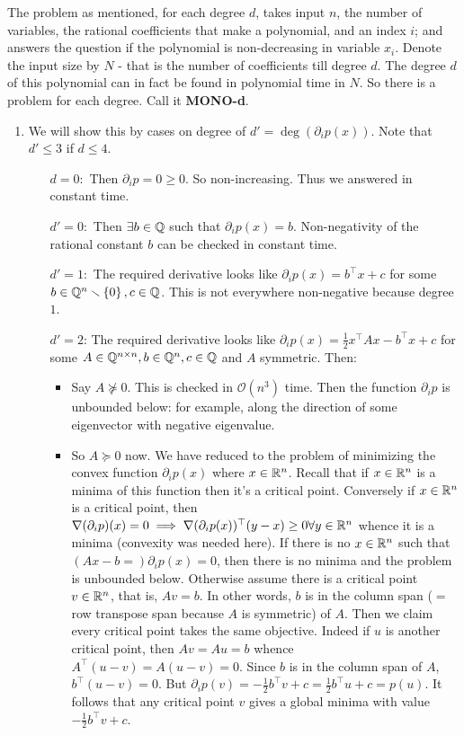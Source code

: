 The problem as mentioned, for each degree $d$, takes input $n$, the number of variables, the rational coefficients that make a polynomial, and an index $i$; and answers the question if the polynomial is non-decreasing in variable $x_{i}$. Denote the input size by $N$ - that is the number of coefficients till degree $d$. The degree $d$ of this polynomial can in fact be found in polynomial time in $N$. So there is a problem for each degree. Call it \textbf{MONO-d}.

\begin{enumerate}[label=(\roman*)]
\item We will show this by cases on degree of $d'=\deg(\partial_{i}p(x))$. Note that $d'\le 3$ if $d\le 4$.
\begin{itemize}
\item[$d=0:$] Then $\partial_{i}p = 0\ge 0$. So non-increasing. Thus we answered in constant time.
\item[$d'=0:$] Then $\exists b\in \mathbb{Q}$ such that $\partial_{i}p(x) = b$. Non-negativity of the rational constant $b$ can be checked in constant time.
\item[$d'=1:$] The required derivative looks like $\partial_{i}p(x) = b^{\top}x + c$ for some $b\in\mathbb{Q}^{n}\smallsetminus \left\{0\right\}, c\in\mathbb{Q}$. This is not everywhere non-negative because degree $1$.
\item[$d'=2$:] The required derivative looks like $\partial_{i}p(x) = \frac12x^{\top}Ax - b^{\top}x + c$ for some $A\in\mathbb{Q}^{n\times n},b\in\mathbb{Q}^{n}, c\in\mathbb{Q}$ and $A$ symmetric. Then:
\begin{itemize}
\item Say $A \not\succeq 0$. This is checked in $\mathcal{O}(n^{3})$ time. Then the function $\partial_{i}p$ is unbounded below: for example, along the direction of some eigenvector with negative eigenvalue.
\item So $A\succeq 0$ now. We have reduced to the problem of minimizing the convex function $\partial_{i}p(x)$ where $x\in\mathbb{R}^{n}$. Recall that if $x\in\mathbb{R}^{n}$ is a minima of this function then it's a critical point. Conversely if $x\in \mathbb{R}^{n}$ is a critical point, then $\nabla(\partial_{i}p)(x) = 0\implies \nabla(\partial_{i}p(x))^{\top}(y-x)\ge0\forall y\in\mathbb{R}^{n}$ whence it is a minima (convexity was needed here). If there is no $x\in\mathbb{R}^{n}$ such that $(Ax-b=)\partial_{i}p(x)=0$, then there is no minima and the problem is unbounded below. Otherwise assume there is a critical point $v \in\mathbb{R}^{n}$, that is, $Av=b$. In other words, $b$ is in the column span ($=$ row transpose span because $A$ is symmetric) of $A$. Then we claim every critical point takes the same objective. Indeed if $u$ is another critical point, then $Av = Au = b$ whence $A^{\top}(u-v)=A(u-v)=0$. Since $b$ is in the column span of $A$, $b^{\top}(u-v)=0$. But $\partial_{i}p(v) = -\frac12b^{\top}v+c = \frac12b^{\top}u+c=p(u)$. It follows that any critical point $v$ gives a global minima with value $-\frac12b^{\top}v+c$. 

\end{itemize}
\end{itemize}
\end{enumerate}
